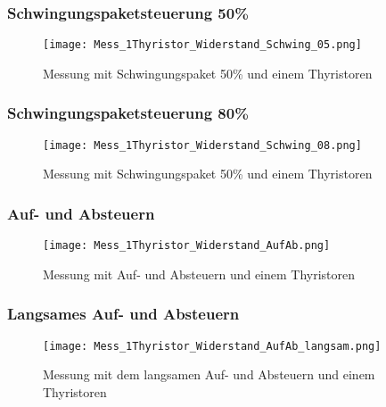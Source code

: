 \begin{appendix}
\newpage
\subsubsection*{Schwingungspaketsteuerung 50\%}

\begin{figure}[ht]
	\centering
	\texttt{[image: Mess\_1Thyristor\_Widerstand\_Schwing\_05.png]}	
	\caption{Messung mit Schwingungspaket 50\% und einem Thyristoren}\label{fig:Mess_1Thyristor_Schwing_50}
\end{figure}

\newpage
\subsubsection*{Schwingungspaketsteuerung 80\%}

\begin{figure}[ht]
	\centering
	\texttt{[image: Mess\_1Thyristor\_Widerstand\_Schwing\_08.png]}	
	\caption{Messung mit Schwingungspaket 50\% und einem Thyristoren}\label{fig:Mess_1Thyristoren_Schwing_80}	
\end{figure}

\newpage
\subsubsection*{Auf- und Absteuern}

\begin{figure}[ht]
	\centering
	\texttt{[image: Mess\_1Thyristor\_Widerstand\_AufAb.png]}	
	\caption{Messung mit Auf- und Absteuern und einem Thyristoren}\label{Mess_1Thyristoren_Widerstand_AufAbFahren}	
\end{figure}

\newpage
\subsubsection*{Langsames Auf- und Absteuern}

\begin{figure}[ht]
	\centering
	\texttt{[image: Mess\_1Thyristor\_Widerstand\_AufAb\_langsam.png]}	
	\caption{Messung mit dem langsamen Auf- und Absteuern und einem Thyristoren}\label{Mess_1Thyristoren_Widerstand_AufAbFahren_langsam}	
\end{figure}

\end{appendix}


